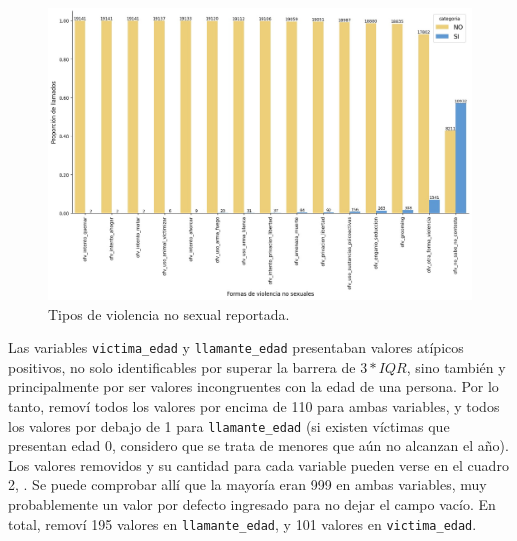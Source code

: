 \documentclass[10 pt]{article}
\begin{document}
\begin{figure}[H]
\begin{center}
\includegraphics[scale=.5]{images/latex_ofv_sino.jpeg}
\caption{Tipos de violencia no sexual reportada.}
\label{ofvsino}
\end{center}
\end{figure} 



Las variables \texttt{victima\_edad} y \texttt{llamante\_edad} presentaban valores atípicos positivos, no solo identificables por superar la barrera de \(3*IQR\), sino también y principalmente por ser valores incongruentes con la edad de una persona. Por lo tanto, removí todos los valores por encima de 110 para ambas variables, y todos los valores por debajo de 1 para \texttt{llamante\_edad} (si existen víctimas que presentan edad 0, considero que se trata de menores que aún no alcanzan el año). Los valores removidos y su cantidad para cada variable pueden verse en el cuadro 2, . Se puede comprobar allí que la mayoría eran 999 en ambas variables, muy probablemente un valor por defecto ingresado para no dejar el campo vacío. En total, removí 195 valores en \texttt{llamante\_edad}, y 101 valores en \texttt{victima\_edad}. 
\end{document}
